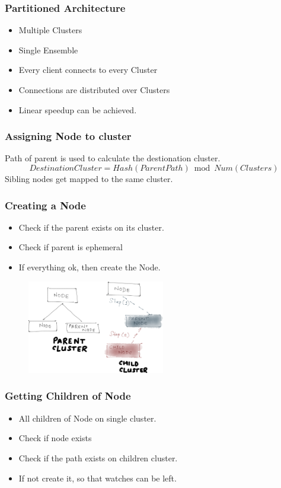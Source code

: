 \documentclass[10pt, compress]{beamer}
\begin{document}
\begin{frame}[fragile]
    \frametitle{Partitioned Architecture}
    \begin{itemize}
        \item Multiple Clusters
        \item Single Ensemble
        \item Every client connects to every Cluster
        \item Connections are distributed over Clusters
        \item Linear speedup can be achieved.
    \end{itemize}
\end{frame}

\begin{frame}[fragile]
    \frametitle{Assigning Node to cluster}
    Path of parent is used to calculate the destionation cluster.
    \begin{equation}
        DestinationCluster = Hash(Parent Path)\bmod Num(Clusters)
    \end{equation}
    Sibling nodes get mapped to the same cluster.
\end{frame}

\begin{frame}[fragile]
    \frametitle{Creating a Node}
    \begin{itemize}
        \item Check if the parent exists on its cluster.
        \item Check if parent is ephemeral
        \item If everything ok, then create the Node.
    \end{itemize}
    \begin{figure}[ht!]
        \centering
        \includegraphics[width=60mm]{images/ParKazooCreate.png}
    \end{figure}
\end{frame}

\begin{frame}[fragile]
    \frametitle{Getting Children of Node}
    \begin{itemize}
        \item All children of Node on single cluster.
        \item Check if node exists
        \item Check if the path exists on children cluster.
        \item If not create it, so that watches can be left.
    \end{itemize}
\end{frame}
\end{document}
